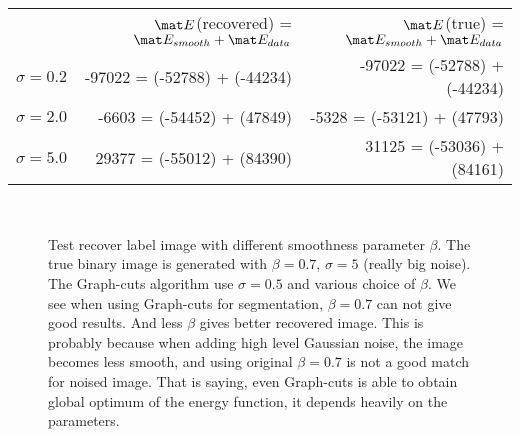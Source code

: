 \documentclass[12pt]{article}
\begin{document}
\begin{tabular} {l | r | r}
 & $\mat E$(recovered) = $\mat E_{smooth} + \mat E_{data}$ & $\mat E$(true) = $\mat E_{smooth} + \mat E_{data}$ \\
$\sigma = 0.2$ & -97022 = (-52788) + (-44234) &  -97022 = (-52788) + (-44234) \\
$\sigma = 2.0$ & -6603 = (-54452) + (47849) &  -5328 = (-53121) + (47793) \\
$\sigma = 5.0$ & 29377 = (-55012) + (84390) &  31125 = (-53036) + (84161) \\
\end{tabular}

\begin{figure}[ht]
\centering
{}
\\
\caption{Test recover label image with different smoothness parameter $\beta$. The true binary image is generated with $\beta = 0.7$, $\sigma = 5$ (really big noise). The Graph-cuts algorithm use $\sigma = 0.5$ and various choice of $\beta$. We see when using Graph-cuts for segmentation, $\beta = 0.7$ can not give good results. And less $\beta$ gives better recovered image. This is probably because when adding high level Gaussian noise, the image becomes less smooth, and using original $\beta = 0.7$ is not a good match for noised image. That is saying, even Graph-cuts is able to obtain global optimum of the energy function, it depends heavily on the parameters. }
\end{figure} 


\end{document}

